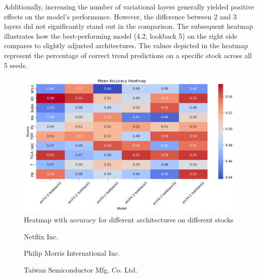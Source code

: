 Additionally, increasing the number of variational layers generally yielded positive effects on the model's performance. However, the difference between 2 and 3 layers did not significantly stand out in the comparison. The subsequent heatmap illustrates how the best-performing model (4.2, lookback 5) on the right side compares to slightly adjusted architectures. The values depicted in the heatmap represent the percentage of correct trend predictions on a specific stock across all 5 seeds.

\begin{figure}[h]
\centering
  \includegraphics[width=1.0\columnwidth]{gfx/Heatmap}
  \hfill
 \caption{Heatmap with accuracy for different architectures on different stocks}
 \label{fig:Heatmap}
\end{figure}

\begin{figure}[!htbp]
  \centering
    \caption{Netflix Inc.}
    \label{fig:NFLX}
\end{figure}

\begin{figure}[!htbp]
    \centering
    \caption{Philip Morris International Inc.} 
    \label{fig:PM}
\end{figure}


\begin{figure}[!htbp]
    \centering
    \caption{Taiwan Semiconductor Mfg. Co. Ltd.}
    \label{fig:TSM}
\end{figure}

